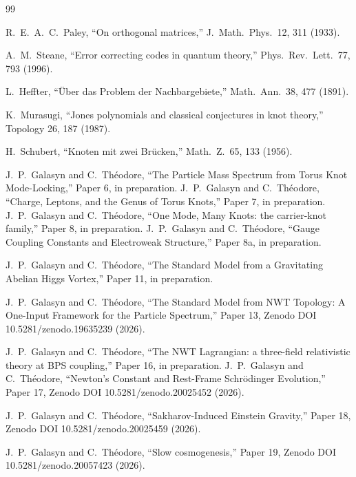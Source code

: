 \documentclass[11pt]{article}
\begin{document}

\begin{thebibliography}{99}

 R.~E.~A.~C.~Paley, ``On orthogonal matrices,'' J.\ Math.\ Phys.\ 12, 311 (1933).


 A.~M.~Steane, ``Error correcting codes in quantum theory,'' Phys.\ Rev.\ Lett.\ 77, 793 (1996).

 L.~Heffter, ``\"Uber das Problem der Nachbargebiete,'' Math.\ Ann.\ 38, 477 (1891).

 K.~Murasugi, ``Jones polynomials and classical conjectures in knot theory,'' Topology 26, 187 (1987).

 H.~Schubert, ``Knoten mit zwei Br\"ucken,'' Math.\ Z.\ 65, 133 (1956).

 J.~P.~Galasyn and C.~Th\'eodore, ``The Particle Mass Spectrum from Torus Knot Mode-Locking,'' Paper 6, in preparation.
 J.~P.~Galasyn and C.~Th\'eodore, ``Charge, Leptons, and the Genus of Torus Knots,'' Paper 7, in preparation.
 J.~P.~Galasyn and C.~Th\'eodore, ``One Mode, Many Knots: the carrier-knot family,'' Paper 8, in preparation.
 J.~P.~Galasyn and C.~Th\'eodore, ``Gauge Coupling Constants and Electroweak Structure,'' Paper 8a, in preparation.

 J.~P.~Galasyn and C.~Th\'eodore, ``The Standard Model from a Gravitating Abelian Higgs Vortex,'' Paper 11, in preparation.

 J.~P.~Galasyn and C.~Th\'eodore, ``The Standard Model from NWT Topology: A One-Input Framework for the Particle Spectrum,'' Paper 13, Zenodo DOI 10.5281/zenodo.19635239 (2026).

 J.~P.~Galasyn and C.~Th\'eodore, ``The NWT Lagrangian: a three-field relativistic theory at BPS coupling,'' Paper 16, in preparation.
 J.~P.~Galasyn and C.~Th\'eodore, ``Newton's Constant and Rest-Frame Schr\"odinger Evolution,'' Paper 17, Zenodo DOI 10.5281/zenodo.20025452 (2026).

 J.~P.~Galasyn and C.~Th\'eodore, ``Sakharov-Induced Einstein Gravity,'' Paper 18, Zenodo DOI 10.5281/zenodo.20025459 (2026).

 J.~P.~Galasyn and C.~Th\'eodore, ``Slow cosmogenesis,'' Paper 19, Zenodo DOI 10.5281/zenodo.20057423 (2026).


\end{thebibliography}
\end{document}
